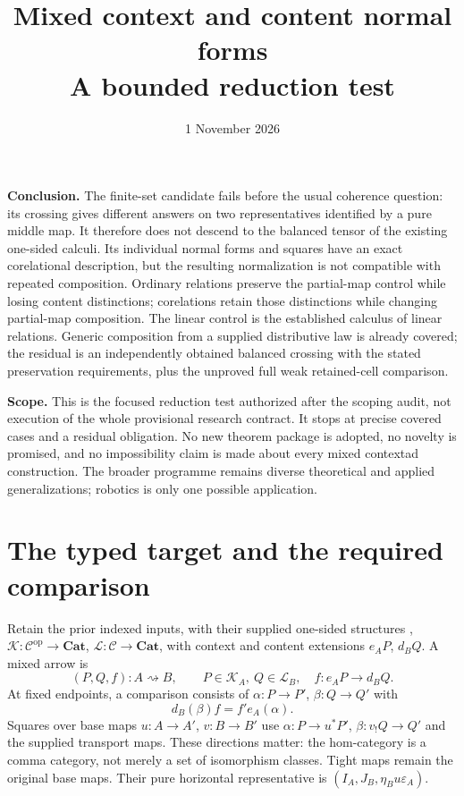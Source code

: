 \documentclass[11pt,a4paper]{article}
\title{Mixed context and content normal forms\\[3pt]\large A bounded reduction test}
\author{}
\date{1 November 2026}
\newcommand{\C}{\mathcal C}
\newcommand{\K}{\mathcal K}
\newcommand{\Lcat}{\mathcal L}
\newcommand{\Cat}{\mathbf{Cat}}
\newcommand{\op}{\mathrm{op}}
\begin{document}
\maketitle
\vspace{-1.5em}

\textbf{Conclusion.} The finite-set candidate fails before the usual coherence
question: its crossing gives different answers on two representatives identified
by a pure middle map. It therefore does not descend to the balanced tensor of
the existing one-sided calculi. Its individual normal forms and squares have an
exact corelational description, but the resulting normalization is not compatible
with repeated composition. Ordinary relations preserve the partial-map control
while losing content distinctions; corelations retain those distinctions while
changing partial-map composition. The linear control is the established calculus
of linear relations. Generic composition from a supplied distributive law is
already covered; the residual is an independently obtained balanced crossing with
the stated preservation requirements, plus the unproved full weak retained-cell
comparison.

\textbf{Scope.} This is the focused reduction test authorized after the scoping
audit, not execution of the whole provisional research contract. It stops at
precise covered cases and a residual obligation. No new theorem package is
adopted, no novelty is promised, and no impossibility claim is made about every
mixed contextad construction. The broader programme remains diverse theoretical
and applied generalizations; robotics is only one possible application.

\section{The typed target and the required comparison}

Retain the prior indexed inputs, with their supplied one-sided structures
\cite{CM},
\(\K:\C^{\op}\to\Cat\), \(\Lcat:\C\to\Cat\), with context and content
extensions \(e_AP\), \(d_BQ\). A mixed arrow is
\[
 (P,Q,f):A\rightsquigarrow B,
 \qquad P\in\K_A,\ Q\in\Lcat_B,\quad f:e_AP\to d_BQ.
\]
At fixed endpoints, a comparison consists of
\(\alpha:P\to P'\), \(\beta:Q\to Q'\) with
\[
 d_B(\beta)f=f'e_A(\alpha).
 \tag{1}
\]
Squares over base maps \(u:A\to A'\), \(v:B\to B'\) use
\(\alpha:P\to u^*P'\), \(\beta:v_!Q\to Q'\) and the supplied transport maps.
These directions matter: the hom-category is a comma category, not merely a set
of isomorphism classes. Tight maps remain the original base maps. Their pure
horizontal representative is
\((I_A,J_B,\eta_Bu\varepsilon_A)\).
\end{document}
